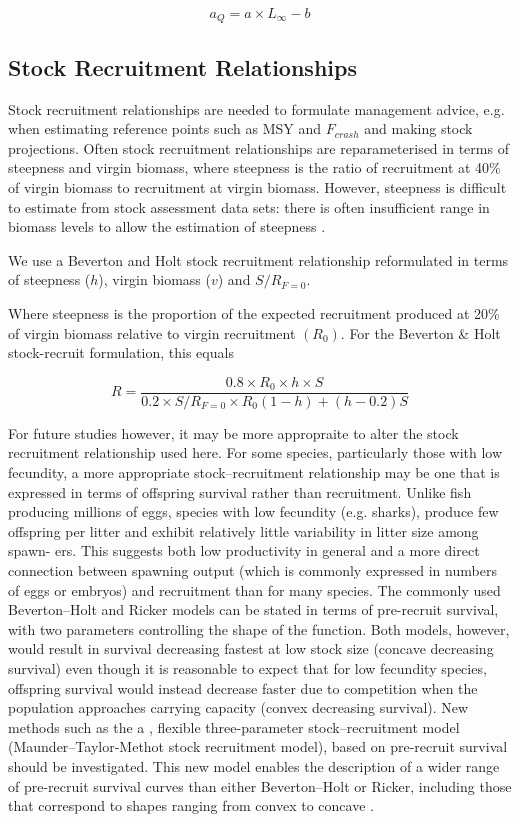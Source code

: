 \documentclass[preprint,authoryear,12pt]{elsarticle}
\begin{document}
\begin{equation} 
a_{Q}=a \times L_{\infty}-b 
\end{equation}  
 
\subsection{Stock Recruitment Relationships} 
 
Stock recruitment relationships are needed to formulate management advice, e.g. when estimating reference points such as MSY and $F_{crash}$ and making stock projections. 
Often stock recruitment relationships are reparameterised in terms of steepness and virgin biomass, where steepness  
is the ratio of recruitment at 40\% of virgin biomass to recruitment at virgin biomass. However, steepness is difficult to estimate from  
stock assessment data sets: there is often insufficient range in biomass levels to allow the estimation of steepness \citet{ISSF2011steep}. 
 
We use a Beverton and Holt stock recruitment relationship reformulated in terms of steepness ($h$), virgin biomass ($v$) and $S/R_{F=0}$. 
 
Where steepness is the proportion of the expected recruitment produced at 20\% of virgin biomass relative to virgin recruitment $(R_0)$. For the Beverton \& Holt  
stock-recruit formulation, this equals 
 
\begin{equation} 
R=\frac{0.8 \times R_0 \times h \times S}{0.2 \times S/R_{F=0} \times R_0(1-h)+(h-0.2)S} 
\end{equation}  
 
For future studies however, it may be more appropraite to alter the stock recruitment relationship used here. For some species, 
particularly those with low  
fecundity, a more appropriate stock–recruitment relationship may  
be one that is expressed in terms of offspring survival rather 
than recruitment. Unlike fish producing millions of eggs, species 
with low fecundity (e.g. sharks), produce few offspring per litter  
and exhibit relatively little variability in litter size among spawn-  
ers. This suggests both low productivity in general and a more  
direct connection between spawning output (which is commonly 
expressed in numbers of eggs or embryos) and recruitment than  
for many species. The commonly used Beverton–Holt and Ricker 
models can be stated in terms of pre-recruit survival, with two  
parameters controlling the shape of the function. Both models, however, would result in survival decreasing fastest at low stock 
size (concave decreasing survival) even though it is  reasonable 
to expect that for low fecundity species, offspring survival would 
instead decrease faster due to competition when the population 
approaches carrying capacity (convex decreasing survival). New methods such as the a , flexible three-parameter 
stock–recruitment model (Maunder–Taylor-Methot stock recruitment 
model), based on pre-recruit survival should be investigated. This new model enables 
the description of a wider range of pre-recruit survival curves than 
either Beverton–Holt or Ricker, including those that correspond to 
shapes ranging from convex to concave \citet{taylor2012srr}. 
\end{document}

